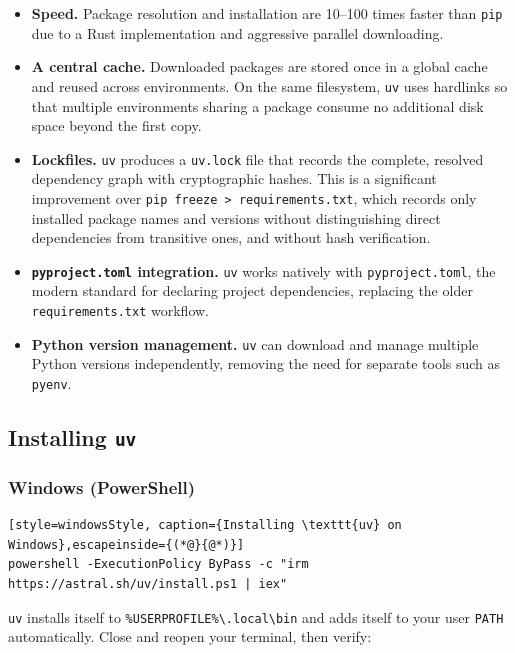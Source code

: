 \begin{itemize}
  \item \textbf{Speed.} Package resolution and installation are
        10--100 times faster than \texttt{pip} due to a Rust
        implementation and aggressive parallel downloading.
  \item \textbf{A central cache.} Downloaded packages are stored once
        in a global cache and reused across environments. On the same
        filesystem, \texttt{uv} uses hardlinks so that multiple
        environments sharing a package consume no additional disk space
        beyond the first copy.
  \item \textbf{Lockfiles.} \texttt{uv} produces a \texttt{uv.lock}
        file that records the complete, resolved dependency graph with
        cryptographic hashes. This is a significant improvement over
        \texttt{pip freeze > requirements.txt}, which records only
        installed package names and versions without distinguishing
        direct dependencies from transitive ones, and without hash
        verification.
  \item \textbf{\texttt{pyproject.toml} integration.} \texttt{uv}
        works natively with \texttt{pyproject.toml}, the modern
        standard for declaring project dependencies, replacing the
        older \texttt{requirements.txt} workflow.
  \item \textbf{Python version management.} \texttt{uv} can download
        and manage multiple Python versions independently, removing the
        need for separate tools such as \texttt{pyenv}.
\end{itemize}

\subsection{Installing \texttt{uv}}

\subsubsection{Windows (PowerShell)}

\begin{lstlisting}[style=windowsStyle, caption={Installing \texttt{uv} on Windows},escapeinside={(*@}{@*)}]
powershell -ExecutionPolicy ByPass -c "irm https://astral.sh/uv/install.ps1 | iex"
\end{lstlisting}

\texttt{uv} installs itself to
\texttt{\%USERPROFILE\%\textbackslash.local\textbackslash bin} and
adds itself to your user \texttt{PATH} automatically. Close and reopen
your terminal, then verify:

